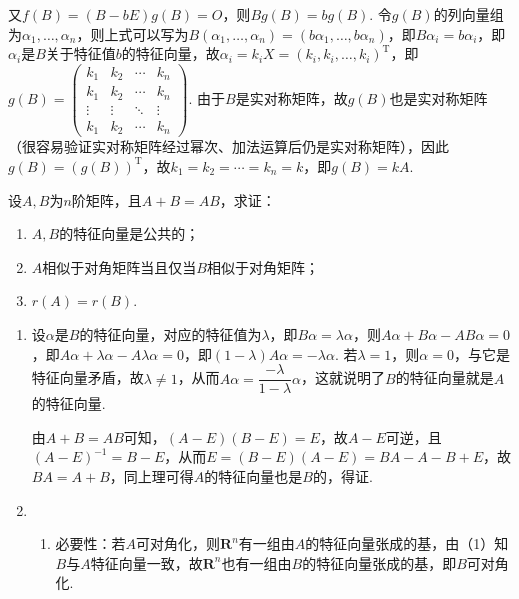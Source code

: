 \begin{exercise}
\begin{exgroup}
\begin{answer}
\begin{enumerate}
                      又$f(B)=(B-bE)g(B)=O$，则$Bg(B)=bg(B)$. 令$g(B)$的列向量组为$\alpha_1,\ldots,\alpha_n$，则上式可以写为$B(\alpha_1,\ldots,\alpha_n)=(b\alpha_1,\ldots,b\alpha_n)$，即$B\alpha_i=b\alpha_i$，即$\alpha_i$是$B$关于特征值$b$的特征向量，故$\alpha_i=k_iX=(k_i,k_i,\ldots,k_i)^{\mathrm{T}}$，即$g(B)=\begin{pmatrix}
                              k_1 & k_2 & \cdots & k_n \\ k_1 & k_2 & \cdots & k_n \\ \vdots & \vdots & \ddots & \vdots \\ k_1 & k_2 & \cdots & k_n
                          \end{pmatrix}$. 由于$B$是实对称矩阵，故$g(B)$也是实对称矩阵（很容易验证实对称矩阵经过幂次、加法运算后仍是实对称矩阵），因此$g(B)=(g(B))^\mathrm{T}$，故$k_1=k_2=\cdots=k_n=k$，即$g(B)=kA$.
            \end{enumerate}
        \end{answer}

        \item 设$A,B$为$n$阶矩阵，且$A+B=AB$，求证：
        \begin{enumerate}
            \item $A,B$的特征向量是公共的；

            \item $A$相似于对角矩阵当且仅当$B$相似于对角矩阵；

            \item $r(A)=r(B)$.
        \end{enumerate}
        \begin{answer}
            \begin{enumerate}
                \item 设$\alpha$是$B$的特征向量，对应的特征值为$\lambda$，即$B\alpha=\lambda\alpha$，则$A\alpha+B\alpha-AB\alpha=0$，即$A\alpha+\lambda\alpha-A\lambda\alpha=0$，即$(1-\lambda)A\alpha=-\lambda\alpha$. 若$\lambda=1$，则$\alpha=0$，与它是特征向量矛盾，故$\lambda\neq 1$，从而$A\alpha=\dfrac{-\lambda}{1-\lambda}\alpha$，这就说明了$B$的特征向量就是$A$的特征向量.

                      由$A+B=AB$可知，$(A-E)(B-E)=E$，故$A-E$可逆，且$(A-E)^{-1}=B-E$，从而$E=(B-E)(A-E)=BA-A-B+E$，故$BA=A+B$，同上理可得$A$的特征向量也是$B$的，得证.

                \item \begin{enumerate}
                          \item 必要性：若$A$可对角化，则$\mathbf{R}^n$有一组由$A$的特征向量张成的基，由（1）知$B$与$A$特征向量一致，故$\mathbf{R}^n$也有一组由$B$的特征向量张成的基，即$B$可对角化.


\end{enumerate}
\end{enumerate}
\end{answer}
\end{exgroup}
\end{exercise}
